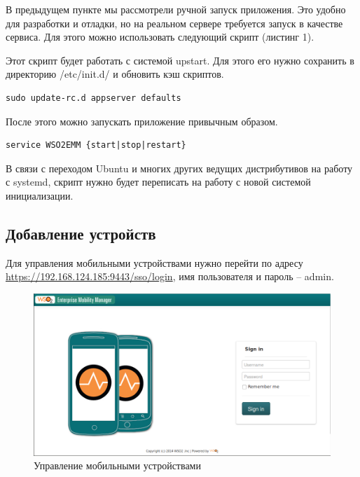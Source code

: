 \documentclass[a4paper, 12pt]{article}		%
\begin{document}
В предыдущем пункте мы рассмотрели ручной запуск приложения. Это удобно для разработки и отладки, но на реальном сервере требуется запуск в качестве сервиса. Для этого можно использовать следующий скрипт (листинг 1).

Этот скрипт будет работать с системой upstart. Для этого его нужно сохранить в директорию /etc/init.d/ и обновить кэш скриптов.

\begin{Verbatim}[frame=single]
sudo update-rc.d appserver defaults
\end{Verbatim}

После этого можно запускать приложение привычным образом.

\begin{Verbatim}[frame=single]
service WSO2EMM {start|stop|restart}
\end{Verbatim}

В связи с переходом Ubuntu и многих других ведущих дистрибутивов на работу с systemd, скрипт нужно будет переписать на работу с новой системой инициализации.



\subsection{Добавление устройств}

Для управления мобильными устройствами нужно перейти по адресу \url{https://192.168.124.185:9443/sso/login}, имя пользователя и пароль -- admin.

\begin{figure}[h!]
\centering
\includegraphics[scale=0.45]{res/EMM002}
\caption{Управление мобильными устройствами}
\end{figure}
\end{document}
